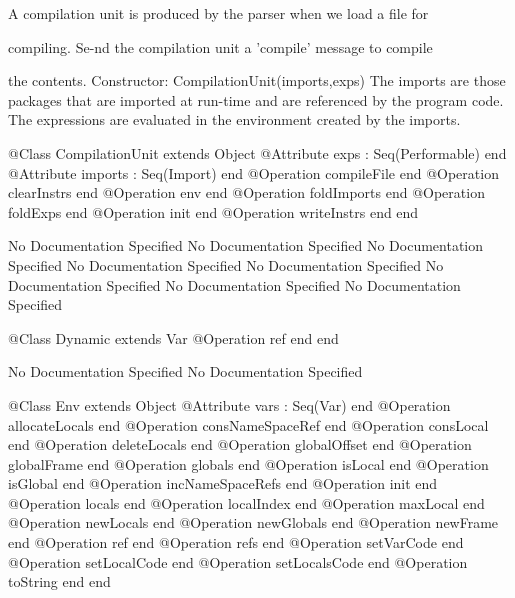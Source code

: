      A compilation unit is produced by the parser when we load a file for

      compiling. Se-nd the compilation unit a 'compile' message to compile

      the contents.
      Constructor: CompilationUnit(imports,exps)
        The imports are those packages that are imported at run-time and 
        are referenced by the program code. The expressions are evaluated 
        in the environment created by the imports.
\begin{Interface}
@Class CompilationUnit extends Object
  @Attribute exps : Seq(Performable) end
  @Attribute imports : Seq(Import) end
  @Operation compileFile end
  @Operation clearInstrs end
  @Operation env end
  @Operation foldImports end
  @Operation foldExps end
  @Operation init end
  @Operation writeInstrs end
end
\end{Interface}
No Documentation Specified
No Documentation Specified
No Documentation Specified
No Documentation Specified
No Documentation Specified
No Documentation Specified
No Documentation Specified
No Documentation Specified
\begin{Interface}
@Class Dynamic extends Var
  @Operation ref end
end
\end{Interface}
No Documentation Specified
No Documentation Specified
\begin{Interface}
@Class Env extends Object
  @Attribute vars : Seq(Var) end
  @Operation allocateLocals end
  @Operation consNameSpaceRef end
  @Operation consLocal end
  @Operation deleteLocals end
  @Operation globalOffset end
  @Operation globalFrame end
  @Operation globals end
  @Operation isLocal end
  @Operation isGlobal end
  @Operation incNameSpaceRefs end
  @Operation init end
  @Operation locals end
  @Operation localIndex end
  @Operation maxLocal end
  @Operation newLocals end
  @Operation newGlobals end
  @Operation newFrame end
  @Operation ref end
  @Operation refs end
  @Operation setVarCode end
  @Operation setLocalCode end
  @Operation setLocalsCode end
  @Operation toString end
end
\end{Interface}
